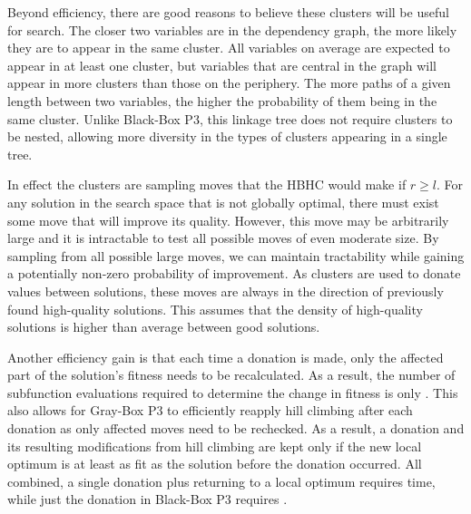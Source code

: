Beyond efficiency, there are good reasons to believe these clusters will be useful
for search. The closer two variables are in the dependency graph, the more likely
they are to appear in the same cluster. All variables on average are expected to appear
in at least one cluster, but variables that are central in the graph will appear in more
clusters than those on the periphery. The more paths of a given
length between two variables, the higher the probability of them being in the same cluster.
Unlike Black-Box P3, this linkage tree does not require clusters to be nested, allowing
more diversity in the types of clusters appearing in a single tree.

In effect the clusters are sampling moves that the HBHC
would make if $r \ge l$. For any solution in the search space that is not globally optimal, there
must exist some move that will improve its quality. However, this move may
be arbitrarily large and it is intractable to test all possible moves of even moderate size.
By sampling from all possible large moves, we can maintain tractability while gaining
a potentially non-zero probability of improvement.
As clusters are used to donate values between solutions, these
moves are always in the direction of previously found high-quality solutions.
This assumes that the density of high-quality solutions is higher than average between good solutions.

Another efficiency gain is that each time a
donation is made, only the affected part of the solution's fitness needs to be
recalculated. As a result, the number of subfunction evaluations required
to determine the change in fitness is only . This also
allows for Gray-Box P3 to efficiently reapply hill climbing after each
donation as only affected moves need to be rechecked. As a result, a donation
and its resulting modifications from hill climbing are kept only if the
new local optimum is at least as fit as the solution before the donation occurred.
All combined, a single donation plus returning to a local optimum requires  time,
while just the donation in Black-Box P3 requires .

